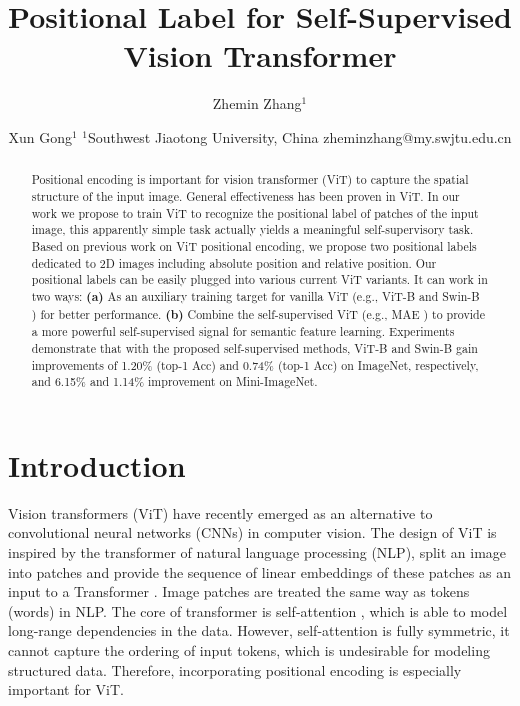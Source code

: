 \documentclass{article}
\title{Positional Label for Self-Supervised Vision Transformer}
\author{
Zhemin Zhang$^1$
\and
Xun Gong$^1$
\affiliations
$^1$Southwest Jiaotong University, China
\emails
zheminzhang@my.swjtu.edu.cn
}
\begin{document}
\maketitle

\begin{abstract}
Positional encoding is important for vision transformer (ViT) to capture the spatial structure of the input image. General effectiveness has been proven in ViT. In our work we propose to train ViT to recognize the positional label of patches of the input image, this apparently simple task actually yields a meaningful self-supervisory task. Based on previous work on ViT positional encoding, we propose two positional labels dedicated to 2D images including absolute position and relative position. Our positional labels can be easily plugged into various current ViT variants. It can work in two ways: \textbf{(a)} As an auxiliary training target for vanilla ViT (e.g., ViT-B \cite{DBLP:journals/corr/abs-2010-11929} and Swin-B \cite{Liu_2021_ICCV}) for better performance. \textbf{(b)} Combine the self-supervised ViT (e.g., MAE \cite{DBLP:journals/corr/abs-2111-06377}) to provide a more powerful self-supervised signal for semantic feature learning. Experiments demonstrate that with the proposed self-supervised methods, ViT-B and Swin-B gain improvements of 1.20\% (top-1 Acc) and 0.74\% (top-1 Acc) on ImageNet, respectively, and 6.15\% and 1.14\% improvement on Mini-ImageNet.
\end{abstract}

\section{Introduction}

Vision transformers (ViT) \cite{DBLP:journals/corr/abs-2010-11929,Zhao2020CVPR} have recently emerged as an alternative to convolutional neural networks (CNNs) in computer vision. The design of ViT is inspired by the transformer of natural language processing (NLP), split an image into patches and provide the sequence of linear embeddings of these patches as an input to a Transformer \cite{pmlr-v139-touvron21a}. Image patches are treated the same way as tokens (words) in NLP. The core of transformer is self-attention \cite{NIPS2017_3f5ee243}, which is able to model long-range dependencies in the data. However, self-attention is fully symmetric, it cannot capture the ordering of input tokens, which is undesirable for modeling structured data. Therefore, incorporating positional encoding is especially important for ViT.
\end{document}
